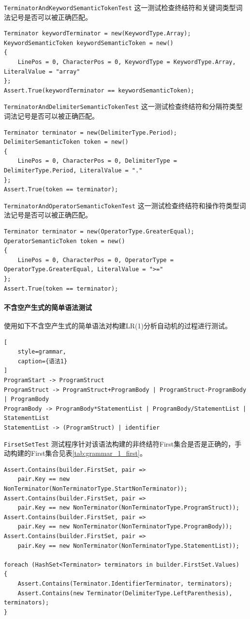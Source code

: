 \documentclass[../main.tex]{subfiles}
\begin{document}
\texttt{TerminatorAndKeywordSemanticTokenTest} 这一测试检查终结符和关键词类型词法记号是否可以被正确匹配。
\begin{lstlisting}[style=csharp]
Terminator keywordTerminator = new(KeywordType.Array);
KeywordSemanticToken keywordSemanticToken = new()
{
    LinePos = 0, CharacterPos = 0, KeywordType = KeywordType.Array, LiteralValue = "array"
};
Assert.True(keywordTerminator == keywordSemanticToken);
\end{lstlisting}

\texttt{TerminatorAndDelimiterSemanticTokenTest} 这一测试检查终结符和分隔符类型词法记号是否可以被正确匹配。
\begin{lstlisting}[style=csharp]
Terminator terminator = new(DelimiterType.Period);
DelimiterSemanticToken token = new()
{
    LinePos = 0, CharacterPos = 0, DelimiterType = DelimiterType.Period, LiteralValue = "."
};
Assert.True(token == terminator);
\end{lstlisting}

\texttt{TerminatorAndOperatorSemanticTokenTest} 这一测试检查终结符和操作符类型词法记号是否可以被正确匹配。
\begin{lstlisting}[style=csharp]
Terminator terminator = new(OperatorType.GreaterEqual);
OperatorSemanticToken token = new()
{
    LinePos = 0, CharacterPos = 0, OperatorType = OperatorType.GreaterEqual, LiteralValue = ">="
};
Assert.True(token == terminator);
\end{lstlisting}

\paragraph{不含空产生式的简单语法测试}

使用如下不含空产生式的简单语法对构建LR(1)分析自动机的过程进行测试。

\begin{lstlisting}[
    style=grammar,
    caption={语法1}
]
ProgramStart -> ProgramStruct
ProgramStruct -> ProgramStruct+ProgramBody | ProgramStruct-ProgramBody | ProgramBody
ProgramBody -> ProgramBody*StatementList | ProgramBody/StatementList | StatementList
StatementList -> (ProgramStruct) | identifier
\end{lstlisting}

\texttt{FirsetSetTest} 测试程序针对该语法构建的非终结符First集合是否是正确的，手动构建的First集合见表\ref{tab:grammar_1_first}。

\begin{lstlisting}[style=csharp]
Assert.Contains(builder.FirstSet, pair =>
    pair.Key == new NonTerminator(NonTerminatorType.StartNonTerminator));
Assert.Contains(builder.FirstSet, pair =>
    pair.Key == new NonTerminator(NonTerminatorType.ProgramStruct));
Assert.Contains(builder.FirstSet, pair =>
    pair.Key == new NonTerminator(NonTerminatorType.ProgramBody));
Assert.Contains(builder.FirstSet, pair =>
    pair.Key == new NonTerminator(NonTerminatorType.StatementList));

foreach (HashSet<Terminator> terminators in builder.FirstSet.Values)
{
    Assert.Contains(Terminator.IdentifierTerminator, terminators);
    Assert.Contains(new Terminator(DelimiterType.LeftParenthesis), terminators);
}
\end{lstlisting}
\end{document}
